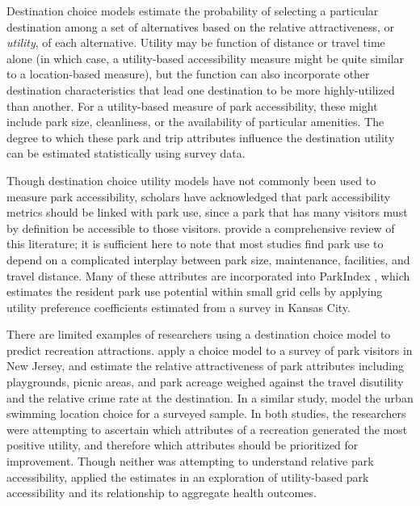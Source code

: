 \documentclass[3p, authoryear, review]{elsarticle} %
\begin{document}
Destination choice models estimate the probability of selecting a particular destination among a set of alternatives based on the relative attractiveness, or \emph{utility}, of each alternative. Utility may be function of distance or travel time alone (in which case, a utility-based accessibility measure might be quite similar to a location-based measure), but the function can also incorporate other destination characteristics that lead one destination to be more highly-utilized than another. For a utility-based measure of park accessibility, these might include park size, cleanliness, or the availability of particular amenities. The degree to which these park and trip attributes influence the destination utility can be estimated statistically using survey data.

Though destination choice utility models have not commonly been used to measure park accessibility, scholars have acknowledged that park accessibility metrics should be linked with park use, since a park that has many visitors must by definition be accessible to those visitors. \citet{McCormack2010} provide a comprehensive review of this literature; it is sufficient here to note that most studies find park use to depend on a complicated interplay between park size, maintenance, facilities, and travel distance. Many of these attributes are incorporated into ParkIndex \citep{Kaczynski2016}, which estimates the resident park use potential within small grid cells by applying utility preference coefficients estimated from a survey in Kansas City.

There are limited examples of researchers using a destination choice model to predict recreation attractions. \citet{Kinnell2006} apply a choice model to a survey of park visitors in New Jersey, and estimate the relative attractiveness of park attributes including playgrounds, picnic areas, and park acreage weighed against the travel disutility and the relative crime rate at the destination. In a similar study, \citet{Meyerhoff2010} model the urban swimming location choice for a surveyed sample. In both studies, the researchers were attempting to ascertain which attributes of a recreation generated the most positive utility, and therefore which attributes should be prioritized for improvement. Though neither was attempting to understand relative park accessibility, \citet{macfarlaneNYC} applied the \citet{Kinnell2006} estimates in an exploration of utility-based park accessibility and its relationship to aggregate health outcomes.
\end{document}
